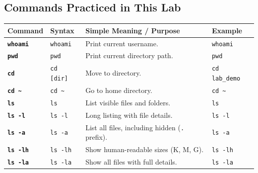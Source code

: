 \documentclass[10pt,a4paper,portrait]{article}
\newcommand{\cmd}[1]{\texttt{\textbf{#1}}}
\begin{document}
\subsection{Commands Practiced in This Lab}
\vspace{-2pt}
\begin{table}[h!]
\centering\footnotesize
\renewcommand{\arraystretch}{1.06}
\begin{tabularx}{\linewidth}{llp{5.4cm}X}
\toprule
\textbf{Command} & \textbf{Syntax} & \textbf{Simple Meaning / Purpose} & \textbf{Example} \\
\midrule
\cmd{whoami} & \texttt{whoami} & Print current username. & \texttt{whoami} \\
\cmd{pwd} & \texttt{pwd} & Print current directory path. & \texttt{pwd} \\
\cmd{cd} & \texttt{cd [dir]} & Move to directory. & \texttt{cd lab\_demo} \\
\cmd{cd \textasciitilde} & \texttt{cd \textasciitilde} & Go to home directory. & \texttt{cd \textasciitilde} \\
\cmd{ls} & \texttt{ls} & List visible files and folders. & \texttt{ls} \\
\cmd{ls -l} & \texttt{ls -l} & Long listing with file details. & \texttt{ls -l} \\
\cmd{ls -a} & \texttt{ls -a} & List all files, including hidden (\texttt{.} prefix). & \texttt{ls -a} \\
\cmd{ls -lh} & \texttt{ls -lh} & Show human-readable sizes (K, M, G). & \texttt{ls -lh} \\
\cmd{ls -la} & \texttt{ls -la} & Show all files with full details. & \texttt{ls -la} \\
\bottomrule
\end{tabularx}
\end{table}
\vspace{-6pt}
\end{document}
